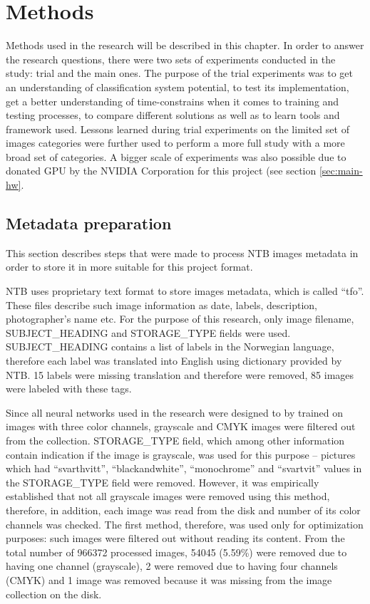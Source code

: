 \chapter{Methods}
\label{chap:methods}

Methods used in the research will be described in this chapter. In order to answer the research questions, there were two sets of experiments conducted in the study: trial and the main ones. The purpose of the trial experiments was to get an understanding of classification system potential, to test its implementation, get a better understanding of time-constrains when it comes to training and testing processes, to compare different solutions as well as to learn tools and framework used. Lessons learned during trial experiments on the limited set of images categories were further used to perform a more full study with a more broad set of categories. A bigger scale of experiments was also possible due to donated GPU by the NVIDIA Corporation for this project (see section \ref{sec:main-hw}.


\section{Metadata preparation}
This section describes steps that were made to process NTB images metadata in order to store it in more suitable for this project format.

NTB uses proprietary text format to store images metadata, which is called ``tfo''. These files describe such image information as date, labels, description, photographer's name etc. For the purpose of this research, only image filename, SUBJECT\_HEADING and STORAGE\_TYPE fields were used. SUBJECT\_HEADING contains a list of labels in the Norwegian language, therefore each label was translated into English using dictionary provided by NTB. 15 labels were missing translation and therefore were removed, 85 images were labeled with these tags.

Since all neural networks used in the research were designed to by trained on images with three color channels, grayscale and CMYK images were filtered out from the collection. STORAGE\_TYPE field, which among other information contain indication if the image is grayscale, was used for this purpose -- pictures which had ``svarthvitt'', ``blackandwhite'', ``monochrome'' and ``svartvit'' values in the STORAGE\_TYPE field were removed. However, it was empirically established that not all grayscale images were removed using this method, therefore, in addition, each image was read from the disk and number of its color channels was checked. The first method, therefore, was used only for optimization purposes: such images were filtered out without reading its content. From the total number of 966372 processed images, 54045 (5.59\%) were removed due to having one channel (grayscale), 2 were removed due to having four channels (CMYK) and 1 image was removed because it was missing from the image collection on the disk.

